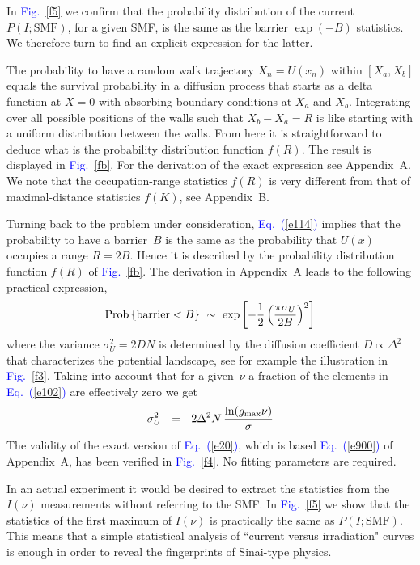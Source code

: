 \documentclass[aps,pre,floats,floatfix,twocolumn]{revtex4}
\newcommand{\mylabel}[1]{\label{#1}}
\newcommand{\eeq}{\end{eqnarray}}
\newcommand{\be}[1]{\begin{eqnarray}\ifthenelse{#1=-1}
{\nonumber}{\ifthenelse{#1=0}{}{\mylabel{e#1}}}}
\newcommand{\Eq}[1]{\textcolor{blue}{Eq.\!\!~(\ref{#1})}}
\newcommand{\Fig}[1]{\textcolor{blue}{Fig.}\!\!~\ref{#1}}
\newcommand{\rmrk}[1]{{#1}}    %
\begin{document}
\rmrk{In \Fig{f5} we confirm that the probability 
distribution of the current $P(I;\text{SMF})$, for a given SMF,  
is the same as the barrier ${\exp(-B)}$ statistics. 
We therefore turn to find an explicit expression for the latter.} 


The probability to have a random walk trajectory $X_n=U(x_n)$ within $[X_a,X_b]$ 
equals the survival probability in a diffusion process  
that starts as a delta function at ${X=0}$ 
with absorbing boundary conditions at $X_a$ and $X_b$.   
Integrating over all possible positions of the walls 
such that ${X_b-X_a=R}$ is like starting with a 
uniform distribution between the walls. From here 
it is straightforward to deduce what is the probability 
distribution function $f(R)$. 
%
\rmrk{ The result is displayed in \Fig{fb}.
For the derivation of the exact expression see Appendix~A. 
We note that the occupation-range statistics $f(R)$ is very different 
from that of maximal-distance statistics $f(K)$, see Appendix~B.} 

Turning back to the problem under consideration, \Eq{e114} implies 
that the probability to have a barrier~$B$ is the same as the 
probability that $U(x)$ occupies a range ${R=2B}$. 
Hence it is described by the probability distribution 
function $f(R)$ of \Fig{fb}. The derivation in Appendix~A 
leads to the following practical expression,  
%
\be{20}
\text{Prob}\left\{\text{barrier}<B\right\} \ \sim \ \exp\left[-\frac{1}{2} \left(\frac{\pi \sigma_U}{2B}\right)^2\right] 
\eeq
%
where the variance $\sigma_U^2 = 2D N$ is determined 
by the diffusion coefficient $D\propto \Delta^2$ 
\rmrk{that characterizes the potential landscape, 
see for example the illustration in \Fig{f3}.}   
Taking into account that for a given~$\nu$ a fraction of the elements
in \Eq{e102} are effectively zero we get 
%
\be{211}
\sigma_U^2 \ \ = \ \ 2 \Delta^2 N  \, \frac{\ln(g_{\text{max}}\nu)}{\sigma}
\eeq  
%  
The validity of the exact version of \Eq{e20}, 
which is based \Eq{e900} of Appendix~A, 
has been verified in \Fig{f4}. 
No fitting parameters are required. 


In an actual experiment it would be desired to 
extract the statistics from the $I(\nu)$ measurements 
without referring to the SMF. \rmrk{In \Fig{f5} we 
show that the statistics of the first maximum 
of $I(\nu)$ is practically the same as $P(I;\text{SMF})$.
This means that a simple statistical analysis of 
``current versus irradiation" curves is enough in order    
to reveal the fingerprints of Sinai-type physics.} 
\end{document}
